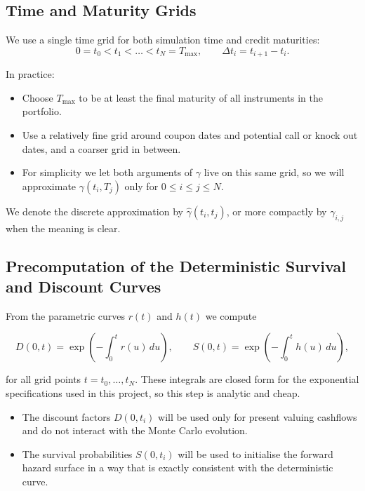 \subsection{Time and Maturity Grids}

We use a single time grid for both simulation time and credit maturities:
\[
0 = t_0 < t_1 < \dots < t_N = T_{\max},
\qquad
\Delta t_i = t_{i+1} - t_i.
\]

In practice:

\begin{itemize}
    \item Choose $T_{\max}$ to be at least the final maturity of all instruments
          in the portfolio.
    \item Use a relatively fine grid around coupon dates and potential call or
          knock out dates, and a coarser grid in between.
    \item For simplicity we let both arguments of $\gamma$ live on this same
          grid, so we will approximate $\gamma(t_i, T_j)$ only for $0 \le i \le j
          \le N$.
\end{itemize}

We denote the discrete approximation by $\widehat{\gamma}(t_i, t_j)$, or more
compactly by $\gamma_{i,j}$ when the meaning is clear.

\subsection{Precomputation of the Deterministic Survival and Discount Curves}

From the parametric curves $r(t)$ and $h(t)$ we compute

\[
D(0,t)
  = \exp\!\left(-\int_0^t r(u)\,du\right), 
\qquad
S(0,t)
  = \exp\!\left(-\int_0^t h(u)\,du\right),
\]

for all grid points $t = t_0,\dots,t_N$. These integrals are closed form for the
exponential specifications used in this project, so this step is analytic and
cheap.

\begin{itemize}
    \item The discount factors $D(0,t_i)$ will be used only for present valuing
          cashflows and do not interact with the Monte Carlo evolution.
    \item The survival probabilities $S(0,t_i)$ will be used to initialise the
          forward hazard surface in a way that is exactly consistent with the
          deterministic curve.
\end{itemize}

